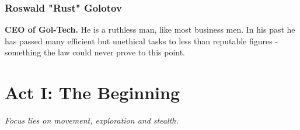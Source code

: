 \documentclass[12pt,a4paper,openany]{book}
\begin{document}
		\subsection{Roswald "Rust" Golotov}
		\textbf{CEO of Gol-Tech.}
		He is a ruthless man, like most business men. In his past he has passed many efficient but unethical tasks to less than reputable figures - something the law could never prove to this point.
	
	\chapter{Act I: The Beginning}
	\textit{Focus lies on movement, exploration and stealth.}
	\par
	
	
\end{document}
